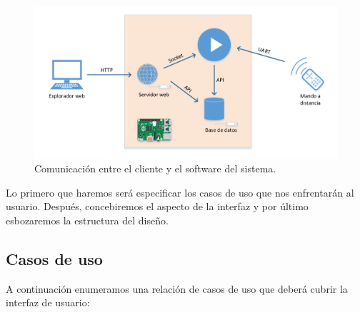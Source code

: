 \smallskip

\begin{figure}[H]
	\noindent \begin{centering}
		\includegraphics[width=\linewidth*3/4]{capitulo4/despliegue}
		\par\end{centering}
	\smallskip
	\caption[Comunicación entre el cliente y el software del sistema]{\label{fig:despliegue} Comunicación entre el cliente y el software del sistema. \cite{svg_raspberry}}
\end{figure} 

\smallskip

Lo primero que haremos será especificar los casos de uso que nos enfrentarán al usuario. Después, concebiremos el aspecto de la interfaz y por último esbozaremos la estructura del diseño.

\subsection{Casos de uso}

A continuación enumeramos una relación de casos de uso que deberá cubrir la interfaz de usuario:

